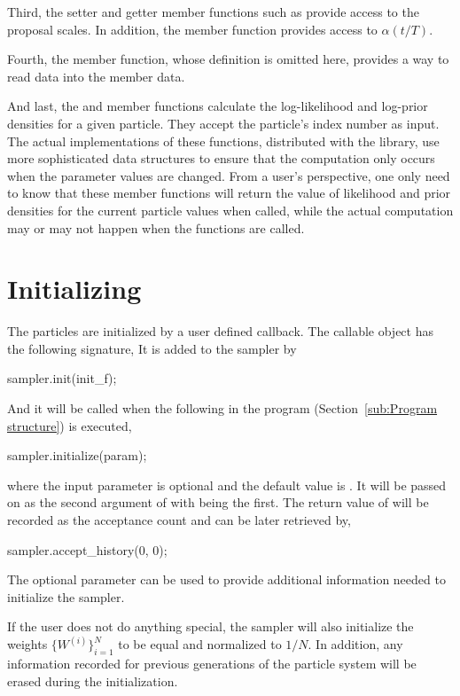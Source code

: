 Third, the setter and getter member functions such as  provide access to the proposal scales. In addition, the member function  provides access to $\alpha(t/T)$.

Fourth, the  member function, whose definition is omitted here, provides a way to read data into the  member data.

And last, the  and  member functions calculate the log-likelihood and log-prior densities for a given particle. They accept the particle's index number as input. The actual implementations of these functions, distributed with the library, use more sophisticated data structures to ensure that the computation only occurs when the parameter values are changed. From a user's perspective, one only need to know that these member functions will return the value of likelihood and prior densities for the current particle values when called, while the actual computation may or may not happen when the functions are called.

\section{Initializing}
\label{sec:Initializing}

The particles are initialized by a user defined callback. The callable object has the following signature,
It is added to the sampler by
\begin{cppcode}
sampler.init(init_f);
\end{cppcode}
And it will be called when the following in the program
(Section~\ref{sub:Program structure}) is executed,
\begin{cppcode}
sampler.initialize(param);
\end{cppcode}
where the input parameter  is optional and the default value is . It will be passed on as the second argument of  with  being the first. The return value of  will be recorded as the acceptance count and can be later retrieved by,
\begin{cppcode}
sampler.accept_history(0, 0);
\end{cppcode}
The optional parameter can be used to provide additional information needed to initialize the sampler.

If the user does not do anything special, the sampler will also initialize the weights $\{W^{(i)}\}_{i=1}^N$ to be equal and normalized to $1/N$. In addition, any information recorded for previous generations of the particle system will be erased during the initialization.

